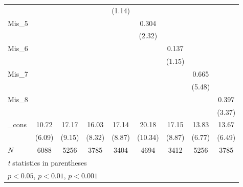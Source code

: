 \documentclass{article}
\begin{document}
{\begin{tabular}{l*{8}{c}}
            &                     &                     &                     &      (1.14)         &                     &                     &                     &                     \\
[1em]
Mis\_5       &                     &                     &                     &                     &       0.304\sym{*}  &                     &                     &                     \\
            &                     &                     &                     &                     &      (2.32)         &                     &                     &                     \\
[1em]
Mis\_6       &                     &                     &                     &                     &                     &       0.137         &                     &                     \\
            &                     &                     &                     &                     &                     &      (1.15)         &                     &                     \\
[1em]
Mis\_7       &                     &                     &                     &                     &                     &                     &       0.665\sym{***}&                     \\
            &                     &                     &                     &                     &                     &                     &      (5.48)         &                     \\
[1em]
Mis\_8       &                     &                     &                     &                     &                     &                     &                     &       0.397\sym{***}\\
            &                     &                     &                     &                     &                     &                     &                     &      (3.37)         \\
[1em]
\_cons      &       10.72\sym{***}&       17.17\sym{***}&       16.03\sym{***}&       17.14\sym{***}&       20.18\sym{***}&       17.15\sym{***}&       13.83\sym{***}&       13.67\sym{***}\\
            &      (6.09)         &      (9.15)         &      (8.32)         &      (8.87)         &     (10.34)         &      (8.87)         &      (6.77)         &      (6.49)         \\
\hline
\(N\)       &        6088         &        5256         &        3785         &        3404         &        4694         &        3412         &        5256         &        3785         \\
\hline\hline
\multicolumn{9}{l}{\footnotesize \textit{t} statistics in parentheses}\\
\multicolumn{9}{l}{\footnotesize \sym{*} \(p<0.05\), \sym{**} \(p<0.01\), \sym{***} \(p<0.001\)}\\
\end{tabular}
}
\end{document}
